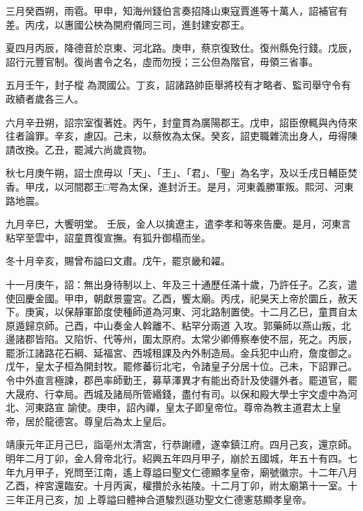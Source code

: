 \begin{pinyinscope}
 三月癸酉朔，雨雹。甲申，知海州錢伯言奏招降山東寇賈進等十萬人，詔補官有差。丙戌，以惠國公柍為開府儀同三司，進封建安郡王。



 夏四月丙辰，降德音於京東、河北路。庚申，蔡京復致仕。復州縣免行錢。戊辰，詔行元豐官制。復尚書令之名，虛而勿授；三公但為階官，毋領三省事。



 五月壬午，封子樅
 為潤國公。丁亥，詔諸路帥臣舉將校有才略者、監司舉守令有政績者歲各三人。



 六月辛丑朔，詔宗室復著姓。丙午，封童貫為廣陽郡王。戊申，詔臣僚輒與內侍來往者論罪。辛亥，慮囚。己未，以蔡攸為太保。癸亥，詔吏職雜流出身人，毋得陳請改換。乙丑，罷減六尚歲貢物。



 秋七月庚午朔，詔士庶毋以「天」、「王」、「君」、「聖」為名字，及以壬戌日輔臣焚香。甲戌，以河間郡王□咢為太保，進封沂王。是月，河東義勝軍叛。熙河、河東路地震。



 九月辛巳，大饗明堂。
 壬辰，金人以擒遼主，遣李孝和等來告慶。是月，河東言粘罕至雲中，詔童貫復宣撫。有狐升御榻而坐。



 冬十月辛亥，賜曾布謚曰文肅。戊午，罷京畿和糴。



 十一月庚午，詔：無出身待制以上、年及三十通歷任滿十歲，乃許任子。乙亥，遣使回慶金國。甲申，朝獻景靈宮。乙酉，饗太廟。丙戌，祀昊天上帝於圜丘，赦天下。庚寅，以保靜軍節度使種師道為河東、河北路制置使。十二月乙巳，童貫自太原遁歸京師。己酉，中山奏金人斡離不、粘罕分兩道
 入攻。郭藥師以燕山叛，北邊諸郡皆陷。又陷忻、代等州，圍太原府。太常少卿傅察奉使不屈，死之。丙辰，罷浙江諸路花石綱、延福宮、西城租課及內外制造局。金兵犯中山府，詹度御之。戊午，皇太子桓為開封牧。罷修蕃衍北宅，令諸皇子分居十位。己未，下詔罪己。令中外直言極諫，郡邑率師勤王，募草澤異才有能出奇計及使疆外者。罷道官，罷大晟府、行幸局。西城及諸局所管緡錢，盡付有司。以保和殿大學士宇文虛中為河北、河東路宣
 諭使。庚申，詔內禪，皇太子即皇帝位。尊帝為教主道君太上皇帝，居於龍德宮。尊皇后為太上皇后。



 靖康元年正月己巳，詣亳州太清宮，行恭謝禮，遂幸鎮江府。四月己亥，還京師。明年二月丁卯，金人脅帝北行。紹興五年四月甲子，崩於五國城，年五十有四。七年九月甲子，兇問至江南，遙上尊謚曰聖文仁德顯孝皇帝，廟號徽宗。十二年八月乙酉，梓宮還臨安。十月丙寅，權攢於永祐陵。十二月丁卯，祔太廟第十一室。十三年正月己亥，加
 上尊謚曰體神合道駿烈遜功聖文仁德憲慈顯孝皇帝。




\end{pinyinscope}
